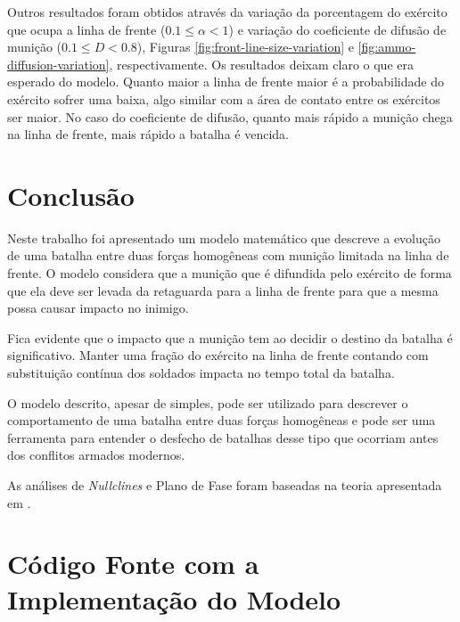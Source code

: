 \documentclass{article}
\begin{document}
Outros resultados foram obtidos através da variação da porcentagem do exército que ocupa a linha de frente ($0.1 \leq \alpha < 1$) e variação do coeficiente de difusão de munição ($0.1 \leq D < 0.8$), Figuras \ref{fig:front-line-size-variation} e \ref{fig:ammo-diffusion-variation}, respectivamente. Os resultados deixam claro o que era esperado do modelo. Quanto maior a linha de frente maior é a probabilidade do exército sofrer uma baixa, algo similar com a área de contato entre os exércitos ser maior. No caso do coeficiente de difusão, quanto mais rápido a munição chega na linha de frente, mais rápido a batalha é vencida.

\section{Conclusão}

Neste trabalho foi apresentado um modelo matemático que descreve a evolução de uma batalha entre duas forças homogêneas com munição limitada na linha de frente. O modelo considera que a munição que é difundida pelo exército de forma que ela deve ser levada da retaguarda para a linha de frente para que a mesma possa causar impacto no inimigo.

Fica evidente que o impacto que a munição tem ao decidir o destino da batalha é significativo. Manter uma fração do exército na linha de frente contando com substituição contínua dos soldados impacta no tempo total da batalha.

O modelo descrito, apesar de simples, pode ser utilizado para descrever o comportamento de uma batalha entre duas forças homogêneas e pode ser uma ferramenta para entender o desfecho de batalhas desse tipo que ocorriam antes dos conflitos armados modernos.

As análises de \textit{Nullclines} e Plano de Fase foram baseadas na teoria apresentada em \cite{chaos}.







\newpage
\appendix
\section{Código Fonte com a Implementação do Modelo}


\end{document}
